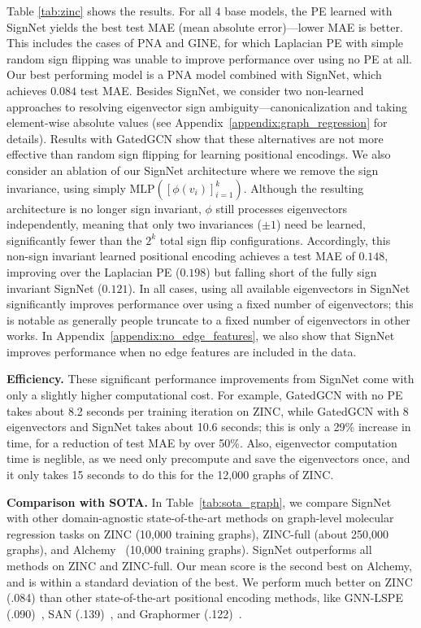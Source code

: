\documentclass{article} \usepackage{iclr2023_conference,times}
\newcommand{\mrm}[1]{\mathrm{#1}}
\begin{document}
Table \ref{tab:zinc} shows the results. For all 4 base models, the PE learned with SignNet yields the best test MAE (mean absolute error)---lower MAE is better. This includes the cases of PNA and GINE, for which Laplacian PE with simple random sign flipping was unable to improve performance over using no PE at all. Our best performing model is a PNA model combined with SignNet, which achieves $0.084$ test MAE. Besides SignNet, we consider two non-learned approaches to resolving eigenvector sign ambiguity---canonicalization and taking element-wise absolute values (see Appendix~\ref{appendix:graph_regression} for details). Results with GatedGCN show that these alternatives are not more effective than random sign flipping for learning positional encodings. We also consider an ablation of our SignNet architecture where we remove the sign invariance, using simply $\mrm{MLP}([\phi(v_i)]_{i=1}^k)$. Although the resulting architecture is no longer sign invariant, $\phi$ still processes eigenvectors independently, meaning that only two invariances ($\pm 1$) need be learned, significantly fewer than the $2^k$ total sign flip configurations. Accordingly, this non-sign invariant learned positional encoding achieves a test MAE of $0.148$, improving over the Laplacian PE ($0.198$) but falling short of the fully sign invariant SignNet ($0.121$). In all cases, using all available eigenvectors in SignNet significantly improves performance over using a fixed number of eigenvectors; this is notable as generally people truncate to a fixed number of eigenvectors in other works.
In Appendix~\ref{appendix:no_edge_features}, we also show that SignNet improves performance when no edge features are included in the data.

\textbf{Efficiency.} These significant performance improvements from SignNet come with only a slightly higher computational cost. For example, GatedGCN with no PE takes about 8.2 seconds per training iteration on ZINC, while GatedGCN with 8 eigenvectors and SignNet takes about 10.6 seconds; this is only a 29\% increase in time, for a reduction of test MAE by over 50\%. Also, eigenvector computation time is neglible, as we need only precompute and save the eigenvectors once, and it only takes 15 seconds to do this for the 12,000 graphs of ZINC.

\textbf{Comparison with SOTA.} In Table~\ref{tab:sota_graph}, we compare SignNet with other domain-agnostic state-of-the-art methods on graph-level molecular regression tasks on ZINC (10,000 training graphs), ZINC-full (about 250,000 graphs), and Alchemy~\citep{chen2019alchemy} (10,000 training graphs).
SignNet outperforms all methods on ZINC and ZINC-full.
Our mean score is the second best on Alchemy, and is within a standard deviation of the best.
We perform much better on ZINC (.084) than other state-of-the-art positional encoding methods, like GNN-LSPE (.090)~\citep{dwivedi2022graph}, SAN (.139)~\citep{kreuzer2021rethinking}, and Graphormer (.122)~\citep{ying2021transformers}.
\end{document}
